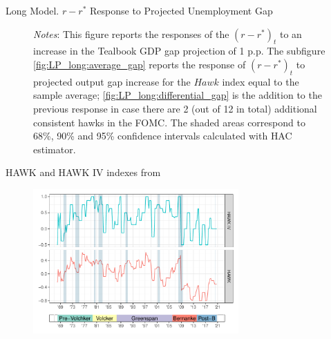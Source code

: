 \documentclass[10pt,aspectratio=169]{beamer}
\begin{document}
\begin{frame}{Long Model. $r-r^*$ Response to Projected Unemployment Gap}
\begin{figure}[!htbp]
\begin{minipage}{1\textwidth}
\begin{subfigure}[b]{0.49\textwidth}
        \end{subfigure}\vspace{-2ex}
            {\begin{flushleft}\tiny\textit{Notes}: This figure reports the responses of the $(r-r^*)_t$ to an increase in the Tealbook GDP gap projection of 1 p.p. The subfigure \ref{fig:LP_long:average_gap} reports the response of $(r-r^*)_t$ to projected output gap increase for the $\mathit{Hawk}$ index equal to the sample average; \ref{fig:LP_long:differential_gap} is the addition to the previous response in case there are 2 (out of 12 in total) additional consistent hawks in the FOMC. The shaded areas correspond to 68\%, 90\% and 95\% confidence intervals calculated with \cite{Andrews1991} HAC estimator. \end{flushleft}}
        \end{minipage}

    \end{figure}
    
\end{frame}



\begin{frame}
\end{frame}



\begin{frame}{HAWK and HAWK IV indexes from \cite{HIM2023}}
    \begin{figure}[h!]
        \includegraphics[width=0.7\textwidth]{HAWK_plot_w_heads.pdf}
    \end{figure}
\end{frame}
\end{document}
